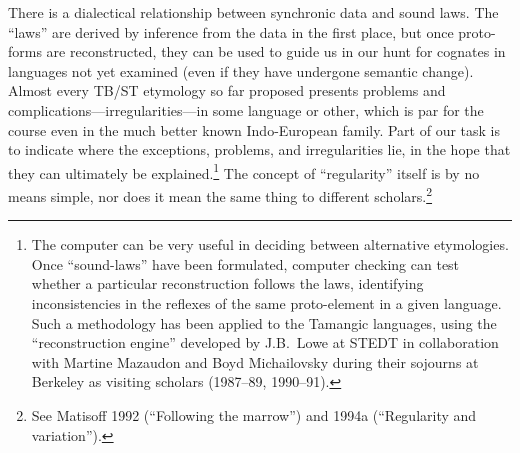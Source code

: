 There is a dialectical relationship between synchronic data and sound laws.
The “laws” are derived by inference from the data in the first place, but once
proto-forms are reconstructed, they can be used to guide us in our hunt for
cognates in languages not yet examined (even if they have undergone semantic
change). Almost every TB/ST etymology so far proposed presents problems and
complications—irregularities—in some language or other, which is par for
the course even in the much better known Indo-European family. Part of our task
is to indicate where the exceptions, problems, and irregularities lie, in the
hope that they can ultimately be explained.\footnote{The computer can be very
useful in deciding between alternative etymologies. Once “sound-laws” have been
formulated, computer checking can test whether a particular reconstruction
follows the laws, identifying inconsistencies in the reflexes of the same
proto-element in a given language. Such a methodology has been applied to the
Tamangic languages, using the “reconstruction engine” developed by J.B.\ Lowe at
STEDT in collaboration with Martine Mazaudon and Boyd Michailovsky during their
sojourns at Berkeley as visiting scholars (1987–89, 1990–91).} The concept of
“regularity” itself is by no means simple, nor does it mean the same thing to
different scholars.\footnote{See Matisoff 1992 (“Following the marrow”) and
1994a (“Regularity and variation”).}


